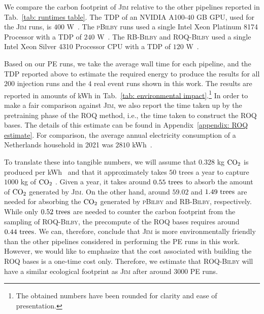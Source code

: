 \documentclass[prd,twocolumn,a4paper,floatfix,nofootinbib,preprintnumbers,superscriptaddress]{revtex4-1}
\begin{document}
We compare the carbon footprint of \textsc{Jim} relative to the other pipelines reported in Tab.~\ref{tab: runtimes table}. The \ac{TDP} of an NVIDIA A100-$40$ GB GPU, used for the \textsc{Jim} runs, is $400$ W~\cite{nvidia_a100_datasheet}. The \textsc{pBilby} runs used a single Intel Xeon Platinum 8174 Processor with a \ac{TDP} of $240$ W~\cite{ark_intel_cpu_datasheet}. The RB-\textsc{Bilby} and ROQ-\textsc{Bilby} used a single Intel Xeon Silver 4310 Processor CPU with a \ac{TDP} of $120$ W~\cite{intel_cpu_datasheet_4310}. 

Based on our \ac{PE} runs, we take the average wall time for each pipeline, and the \ac{TDP} reported above to estimate the required energy to produce the results for all $200$ injection runs and the $4$ real event runs shown in this work. The results are reported in amounts of kWh in Tab.~\ref{tab: environmental impact}.\footnote{The obtained numbers have been rounded for clarity and ease of presentation.} In order to make a fair comparison against \textsc{Jim}, we also report the time taken up by the pretraining phase of the \ac{ROQ} method, i.e., the time taken to construct the \ac{ROQ} bases. The details of this estimate can be found in Appendix~\ref{appendix: ROQ estimate}. For comparison, the average annual electricity consumption of a Netherlands household in 2021 was ${2810}$ kWh~\cite{Statistics_Netherlands_2023}.

To translate these into tangible numbers, we will assume that $0.328$ kg $\rm{CO}_2$ is produced per kWh~\cite{NL_CO2_emissiefactoren} and that it approximately takes $50$ trees a year to capture ${1000}$ kg of $\rm{CO}_2$ \cite{climateneutral_trees_reference}. Given a year, it takes around $0.55 \rm{\ trees}$ to absorb the amount of $\rm{CO}_2$ generated by \textsc{Jim}. On the other hand, around $59.02$ and $1.49\rm{\ trees}$ are needed for absorbing the $\rm{CO}_2$ generated by \textsc{pBilby} and RB-\textsc{Bilby}, respectively. While only $0.52 \rm{\ trees}$ are needed to counter the carbon footprint from the sampling of \ac{ROQ}-\textsc{Bilby}, the precompute of the \ac{ROQ} bases requires around $0.44\rm{\ trees}$. We can, therefore, conclude that \textsc{Jim} is more environmentally friendly than the other pipelines considered in performing the \ac{PE} runs in this work. However, we would like to emphasize that the cost associated with building the \ac{ROQ} bases is a one-time cost only. Therefore, we estimate that \ac{ROQ}-\textsc{Bilby} will have a similar ecological footprint as \textsc{Jim} after around $3000$ \ac{PE} runs.
\end{document}
